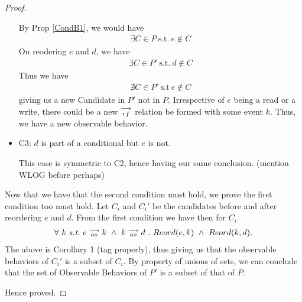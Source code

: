 \begin{proof}
\begin{itemize}
                    By Prop \ref{CondB1}, we would have 
                    \begin{align*}
                        \exists C \in P \ \text{s.t.} \ e \notin C  
                    \end{align*}
                    On reodering $e$ and $d$, we have 
                    \begin{align*}
                        \exists C \in P' \ \text{s.t.} \ d \notin C  
                    \end{align*}
                    Thus we have 
                    \begin{align*}
                        \nexists C \in P' \ \text{s.t} \ e \notin C 
                    \end{align*}
                    giving us a new Candidate in $P'$ not in $P$.
                    Irrespective of $e$ being a read or a write, there could be a new $\stackrel{\longrightarrow}{_{rf}}$ relation be formed with some event $k$. Thus, we have a new observable behavior. 
                    
                
                \item C3: $d$ is part of a conditional but $e$ is not. 
                    
                    This case is symmetric to C2, hence having our same conclusion. (mention WLOG before perhaps)
       
            \end{itemize}

            Now that we have that the second condition must hold, we prove the first condition too must hold. Let $C_i$ and $C_i'$ be the candidates before and after reordering $e$ and $d$. From the first condition we have then for $C_i$
            \begin{align*}
                \forall \ k \ \textit{s.t.} \ 
                \reln{e}{ao}{k} \ \wedge \ \reln{k}{ao}{d} \ . \ 
                Reord(e,k) \ \wedge \ Reord(k,d).
            \end{align*}
            The above is Corollary 1 (tag properly), thus giving us that the observable behaviors of $C_i'$ is a subset of $C_i$. By property of unions of sets, we can conclude that the set of Observable Behaviors of $P'$ is a subset of that of $P$.

            Hence proved.

    \end{proof}

